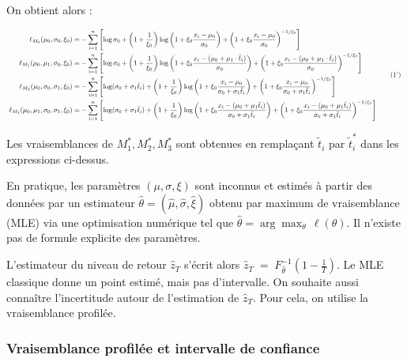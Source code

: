 \documentclass[
  article,
  nofooter,
  noheadings]{jss}
\begin{document}
On obtient alors :

\[
\scalebox{0.7}{
\(
\begin{aligned}
\ell_{M_0}(\mu_0, \sigma_0, \xi_0) &=
-\sum_{i=1}^n \left[
\log \sigma_0 +
\left(1 + \frac{1}{\xi_0} \right) \log \left(1 + \xi_0 \frac{x_i - \mu_0}{\sigma_0} \right) +
\left(1 + \xi_0 \frac{x_i - \mu_0}{\sigma_0} \right)^{-1/\xi_0}
\right]\\ 
\ell_{M_1}(\mu_0, \mu_1, \sigma_0, \xi_0) &=
-\sum_{i=1}^n \left[
\log \sigma_0 +
\left(1 + \frac{1}{\xi_0} \right) \log \left(1 + \xi_0 \frac{x_i - (\mu_0 + \mu_1 \cdot \tilde{t}_i)}{\sigma_0} \right) +
\left(1 + \xi_0 \frac{x_i - (\mu_0 + \mu_1 \cdot \tilde{t}_i)}{\sigma_0} \right)^{-1/\xi_0}
\right]\\ 
\ell_{M_2}(\mu_0, \sigma_0, \sigma_1, \xi_0) &=
-\sum_{i=1}^n \left[
\log (\sigma_0 + \sigma_1 \tilde{t}_i) +
\left(1 + \frac{1}{\xi_0} \right) \log \left(1 + \xi_0 \frac{x_i - \mu_0}{\sigma_0 + \sigma_1 \tilde{t}_i} \right) +
\left(1 + \xi_0 \frac{x_i - \mu_0}{\sigma_0 + \sigma_1 \tilde{t}_i} \right)^{-1/\xi_0}
\right]\\ 
\ell_{M_3}(\mu_0, \mu_1, \sigma_0, \sigma_1, \xi_0) &=
-\sum_{i=1}^n \left[
\log (\sigma_0 + \sigma_1 \tilde{t}_i) +
\left(1 + \frac{1}{\xi_0} \right) \log \left(1 + \xi_0 \frac{x_i - (\mu_0 + \mu_1 \tilde{t}_i)}{\sigma_0 + \sigma_1 \tilde{t}_i} \right) +
\left(1 + \xi_0 \frac{x_i - (\mu_0 + \mu_1 \tilde{t}_i)}{\sigma_0 + \sigma_1 \tilde{t}_i} \right)^{-1/\xi_0}
\right]
\end{aligned}
\tag{1'}
\)
}
\]

Les vraisemblances de \(M_1^*, M_2^*, M_3^*\) sont obtenues en
remplaçant \(\tilde{t}_i\) par \(\tilde{t}_i^\ast\) dans les expressions
ci-dessus.

En pratique, les paramètres \((\mu, \sigma, \xi)\) sont inconnus et
estimés à partir des données par un estimateur
\(\hat{\theta} = (\hat{\mu}, \hat{\sigma}, \hat{\xi})\) obtenu par
maximum de vraisemblance (MLE) via une optimisation numérique tel que
\(\hat{\theta} = \arg\max_{\theta} \, \ell(\theta)\). Il n'existe pas de
formule explicite des paramètres.

L'estimateur du niveau de retour \(\hat{z}_T\) s'écrit alors
\(\hat{z}_{T}\;=\;F^{-1}_{\hat{\theta}}\!\left(1-\frac{1}{T}\right)\).
Le MLE classique donne un point estimé, mais pas d'intervalle. On
souhaite aussi connaître l'incertitude autour de l'estimation de
\(\hat{z}_T\). Pour cela, on utilise la vraisemblance profilée.

\subsubsection{Vraisemblance profilée et intervalle de
confiance}\label{vraisemblance-profiluxe9e-et-intervalle-de-confiance}
\end{document}
